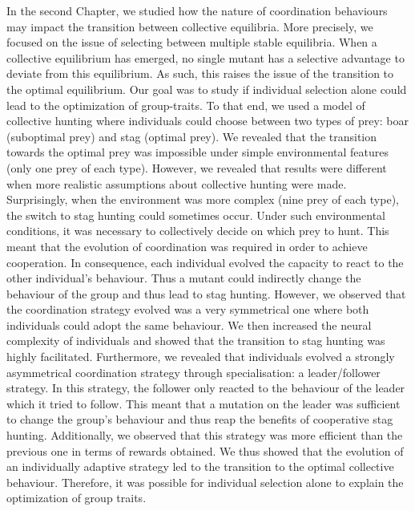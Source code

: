 		In the second Chapter, we studied how the nature of coordination behaviours may impact the transition between collective equilibria. More precisely, we focused on the issue of selecting between multiple stable equilibria. When a collective equilibrium has emerged, no single mutant has a selective advantage to deviate from this equilibrium. As such, this raises the issue of the transition to the optimal equilibrium. Our goal was to study if individual selection alone could lead to the optimization of group-traits. To that end, we used a model of collective hunting where individuals could choose between two types of prey: boar (suboptimal prey) and stag (optimal prey). We revealed that the transition towards the optimal prey was impossible under simple environmental features (only one prey of each type). However, we revealed that results were different when more realistic assumptions about collective hunting were made. Surprisingly, when the environment was more complex (nine prey of each type), the switch to stag hunting could sometimes occur. Under such environmental conditions, it was necessary to collectively decide on which prey to hunt. This meant that the evolution of coordination was required in order to achieve cooperation. In consequence, each individual evolved the capacity to react to the other individual's behaviour. Thus a mutant could indirectly change the behaviour of the group and thus lead to stag hunting. However, we observed that the coordination strategy evolved was a very symmetrical one where both individuals could adopt the same behaviour. We then increased the neural complexity of individuals and showed that the transition to stag hunting was highly facilitated. Furthermore, we revealed that individuals evolved a strongly asymmetrical coordination strategy through specialisation: a leader/follower strategy. In this strategy, the follower only reacted to the behaviour of the leader which it tried to follow. This meant that a mutation on the leader was sufficient to change the group's behaviour and thus reap the benefits of cooperative stag hunting. Additionally, we observed that this strategy was more efficient than the previous one in terms of rewards obtained. We thus showed that the evolution of an individually adaptive strategy led to the transition to the optimal collective behaviour. Therefore, it was possible for individual selection alone to explain the optimization of group traits.


